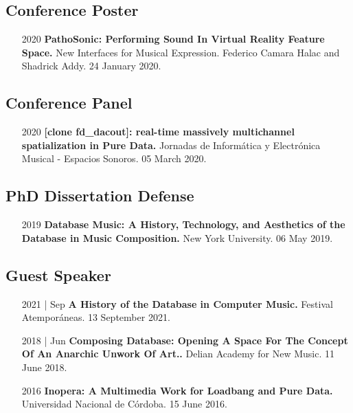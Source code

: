 \documentclass[12pt,overlapped]{res}%
\begin{document}
\begin{resume}
\subsection{Conference Poster}%
\fullline%
\begin{itemize}[align=parleft,leftmargin=2.25cm,labelwidth=2cm]
\item[2020]
\textbf{PathoSonic: Performing Sound In Virtual Reality Feature Space.}
New Interfaces for Musical Expression. 
Federico Camara Halac and Shadrick Addy. 
24 January 2020.
\end{itemize}%
\subsection{Conference Panel}%
\fullline%
\begin{itemize}[align=parleft,leftmargin=2.25cm,labelwidth=2cm]
\item[2020]
\textbf{{[}clone fd\_dacout{]}: real{-}time massively multichannel spatialization in Pure Data.}
Jornadas de Informática y Electrónica Musical {-} Espacios Sonoros. 
05 March 2020.
\end{itemize}%
\subsection{PhD Dissertation Defense}%
\fullline%
\begin{itemize}[align=parleft,leftmargin=2.25cm,labelwidth=2cm]
\item[2019]
\textbf{Database Music: A History, Technology, and Aesthetics of the Database in Music Composition.}
New York University. 
06 May 2019.
\end{itemize}%
\subsection{Guest Speaker}%
\fullline%
\begin{itemize}[align=parleft,leftmargin=2.25cm,labelwidth=2cm]
\item[2021 | Sep]
\textbf{A History of the Database in Computer Music.}
Festival Atemporáneas. 
13 September 2021.
\end{itemize}%
\begin{itemize}[align=parleft,leftmargin=2.25cm,labelwidth=2cm]
\item[2018 | Jun]
\textbf{Composing Database: Opening A Space For The Concept Of An Anarchic Unwork Of Art..}
Delian Academy for New Music. 
11 June 2018.
\end{itemize}%
\begin{itemize}[align=parleft,leftmargin=2.25cm,labelwidth=2cm]
\item[2016]
\textbf{Inopera: A Multimedia Work for Loadbang and Pure Data.}
Universidad Nacional de Córdoba. 
15 June 2016.
\end{itemize}%

\end{resume}
\end{document}
